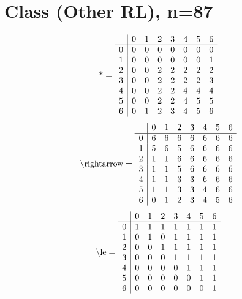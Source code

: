 \documentclass[11pt]{article}
\begin{document}
\section{Class (Other RL), n=87}
\[\text{*} = 
\begin{array}{r | r r r r r r r}
 & 0 & 1 & 2 & 3 & 4 & 5 & 6 \\ \hline
0 & 0 & 0 & 0 & 0 & 0 & 0 & 0 \\
1 & 0 & 0 & 0 & 0 & 0 & 0 & 1 \\
2 & 0 & 0 & 2 & 2 & 2 & 2 & 2 \\
3 & 0 & 0 & 2 & 2 & 2 & 2 & 3 \\
4 & 0 & 0 & 2 & 2 & 4 & 4 & 4 \\
5 & 0 & 0 & 2 & 2 & 4 & 5 & 5 \\
6 & 0 & 1 & 2 & 3 & 4 & 5 & 6 \\
\end{array}
\]
\[\text{\textbackslash rightarrow} = 
\begin{array}{r | r r r r r r r}
 & 0 & 1 & 2 & 3 & 4 & 5 & 6 \\ \hline
0 & 6 & 6 & 6 & 6 & 6 & 6 & 6 \\
1 & 5 & 6 & 5 & 6 & 6 & 6 & 6 \\
2 & 1 & 1 & 6 & 6 & 6 & 6 & 6 \\
3 & 1 & 1 & 5 & 6 & 6 & 6 & 6 \\
4 & 1 & 1 & 3 & 3 & 6 & 6 & 6 \\
5 & 1 & 1 & 3 & 3 & 4 & 6 & 6 \\
6 & 0 & 1 & 2 & 3 & 4 & 5 & 6 \\
\end{array}
\]
\[\text{\textbackslash le} = 
\begin{array}{r | r r r r r r r}
 & 0 & 1 & 2 & 3 & 4 & 5 & 6 \\ \hline
0 & 1 & 1 & 1 & 1 & 1 & 1 & 1 \\
1 & 0 & 1 & 0 & 1 & 1 & 1 & 1 \\
2 & 0 & 0 & 1 & 1 & 1 & 1 & 1 \\
3 & 0 & 0 & 0 & 1 & 1 & 1 & 1 \\
4 & 0 & 0 & 0 & 0 & 1 & 1 & 1 \\
5 & 0 & 0 & 0 & 0 & 0 & 1 & 1 \\
6 & 0 & 0 & 0 & 0 & 0 & 0 & 1 \\
\end{array}
\]
\end{document}
